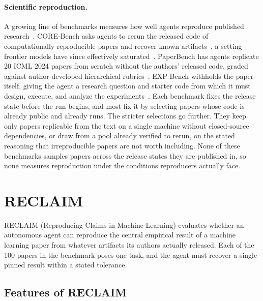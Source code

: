 \documentclass{article} %
\begin{document}
\paragraph{Scientific reproduction.}
A growing line of benchmarks measures how well agents reproduce published
research~\citep{siegel2024corebench,starace2025paperbench,bogin2024super,
xiang2025scireplicate,kon2025expbench,hua2025researchcodebench,
edwards2025rexbench,zhao2025speedrunning,nguyen2026replicatorbench,
wang2026researchenvbench,seo2025paper2code,zhao2025autoreproduce}.
CORE-Bench asks agents to rerun the released code of computationally
reproducible papers and recover known
artifacts~\citep{siegel2024corebench}, a setting frontier models have since
effectively saturated~\citep{favaro2026recursive}. PaperBench has agents
replicate 20 ICML 2024 papers from scratch without the authors' released
code, graded against author-developed hierarchical
rubrics~\citep{starace2025paperbench}. EXP-Bench withholds the paper
itself, giving the agent a research question and starter code from which it
must design, execute, and analyze the experiments~\citep{kon2025expbench}.
Each benchmark fixes the release state before the run begins, and most fix
it by selecting papers whose code is already public and already runs. The
stricter selections go further. They keep only papers replicable from the
text on a single machine without closed-source dependencies, or draw from a
pool already verified to rerun, on the stated reasoning that irreproducible
papers are not worth including. None of these benchmarks
samples papers across the release states they are published in, so none
measures reproduction under the conditions reproducers actually face.

\section{RECLAIM}
\label{sec:reclaim}

RECLAIM (Reproducing Claims in Machine Learning) evaluates whether an
autonomous agent can reproduce the central
empirical result of a machine learning paper from whatever artifacts its
authors actually released. Each of the 100 papers in the benchmark poses one
task, and the agent must recover a single pinned result within a stated
tolerance.
\subsection{Features of RECLAIM}
\label{subsec:features}
\end{document}
